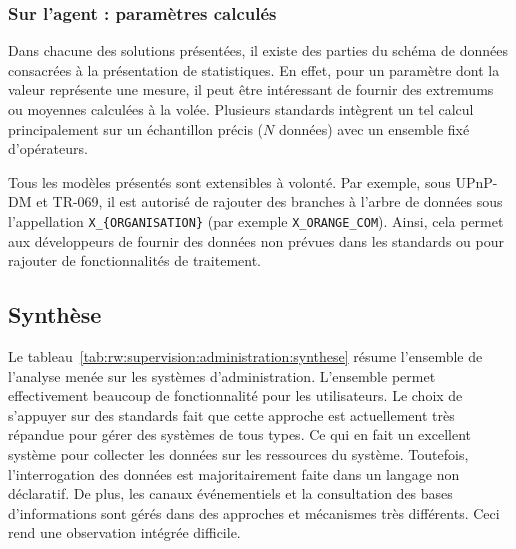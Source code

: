 \subsubsection{Sur l'agent : paramètres calculés}
Dans chacune des solutions présentées, il existe des parties du schéma de données consacrées à la présentation de statistiques. En effet, pour un paramètre dont la valeur représente une mesure, il peut être intéressant de fournir des extremums ou moyennes calculées à la volée. Plusieurs standards intègrent un tel calcul principalement sur un échantillon précis ($N$ données) avec un ensemble fixé d'opérateurs.

Tous les modèles présentés sont extensibles à volonté. Par exemple, sous UPnP-DM et TR-069, il est autorisé de rajouter des branches à l'arbre de données sous l'appellation \verb|X_{ORGANISATION}| (par exemple \verb|X_ORANGE_COM|). Ainsi, cela permet aux développeurs de fournir des données non prévues dans les standards ou pour rajouter de fonctionnalités de traitement.

\subsection{Synthèse}
Le tableau~\ref{tab:rw:supervision:administration:synthese} résume l'ensemble de l'analyse menée sur les systèmes d'administration. L'ensemble permet effectivement beaucoup de fonctionnalité pour les utilisateurs. Le choix de s'appuyer sur des standards fait que cette approche est actuellement très répandue pour gérer des systèmes de tous types. Ce qui en fait un excellent système pour collecter les données sur les ressources du système. Toutefois, l'interrogation des données est majoritairement faite dans un langage non déclaratif. De plus, les canaux événementiels et la consultation des bases d'informations sont gérés dans des approches et mécanismes très différents. Ceci rend une observation intégrée difficile.


